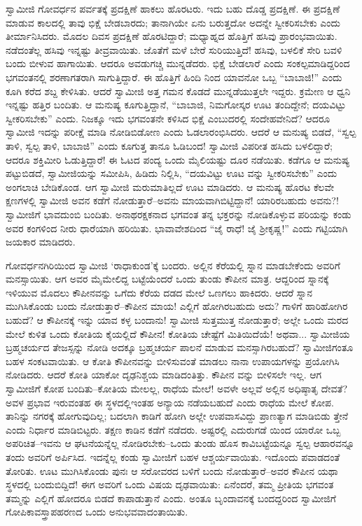 ಸ್ವಾಮೀಜಿ ಗೋವರ್ಧನ ಪರ್ವತಕ್ಕೆ ಪ್ರದಕ್ಷಿಣೆ ಹಾಕಲು ಹೊರಟರು. ಇದು ಬಹು ದೊಡ್ಡ ಪ್ರದಕ್ಷಿಣೆ. ಈ ಪ್ರದಕ್ಷಿಣೆ ಮಾಡುವ ಕಾಲದಲ್ಲಿ ತಾವು ಭಿಕ್ಷೆ ಬೇಡಬಾರದು; ತಾನಾಗಿಯೇ ಏನು ಬರುತ್ತದೋ ಅದನ್ನೇ ಸ್ವೀಕರಿಸಬೇಕು ಎಂದು ತೀರ್ಮಾನಿಸಿದರು. ಮೊದಲ ದಿವಸ ಪ್ರದಕ್ಷಿಣೆ ಹೊರಟಿದ್ದಾರೆ; ಮಧ್ಯಾಹ್ನದ ಹೊತ್ತಿಗೆ ಹಸಿವು ಪ್ರಾರಂಭವಾಯಿತು. ನಡೆದಂತೆಲ್ಲ ಹಸಿವು ಇನ್ನಷ್ಟು ತೀವ್ರವಾಯಿತು. ಜೊತೆಗೆ ಮಳೆ ಬೇರೆ ಸುರಿಯುತ್ತಿದೆ! ಹಸಿವು, ಬಳಲಿಕೆ ಸೇರಿ ಬವಳಿ ಬಂದು ಬೀಳುವ ಹಾಗಾಯಿತು. ಆದರೂ ಅವಡುಗಚ್ಚಿ ಮುನ್ನಡೆದರು. ಭಿಕ್ಷೆ ಬೇಡಲಾರೆ ಎಂದು ಸಂಕಲ್ಪಮಾಡಿದ್ದರಿಂದ ಭಗವಂತನಲ್ಲಿ ಶರಣಾಗತರಾಗಿ ಸಾಗುತ್ತಿದ್ದಾರೆ. ಈ ಹೊತ್ತಿಗೆ ಹಿಂದಿ ನಿಂದ ಯಾವನೋ ಒಬ್ಬ “ಬಾಬಾಜಿ!” ಎಂದು ಕೂಗಿ ಕರೆದ ಶಬ್ದ ಕೇಳಿಸಿತು. ಆದರೆ ಸ್ವಾಮೀಜಿ ಅತ್ತ ಗಮನ ಕೊಡದೆ ಮುನ್ನಡೆಯುತ್ತಲೇ ಇದ್ದರು. ಕ್ರಮೇಣ ಆ ಧ್ವನಿ ಇನ್ನಷ್ಟು ಹತ್ತಿರ ಬಂದಿತು. ಆ ಮನುಷ್ಯ ಕೂಗುತ್ತಿದ್ದಾನೆ, “ಬಾಬಾಜಿ, ನಿಮಗೋಸ್ಕರ ಊಟ ತಂದಿದ್ದೇನೆ; ದಯವಿಟ್ಟು ಸ್ವೀಕರಿಸಬೇಕು” ಎಂದು. ನಿಜಕ್ಕೂ ಇದು ಭಗವಂತನೇ ಕಳಿಸಿದ ಭಿಕ್ಷೆ ಎಂಬುದರಲ್ಲಿ ಸಂದೇಹವೇನಿದೆ? ಆದರೂ ಸ್ವಾಮೀಜಿ ಇದನ್ನು ಪರೀಕ್ಷೆ ಮಾಡಿ ನೋಡಿಬಿಡೋಣ ಎಂದು ಓಡಲಾರಂಭಿಸಿದರು. ಆದರೆ ಆ ಮನುಷ್ಯ ಬಿಡದೆ, “ಸ್ವಲ್ಪ ತಾಳಿ, ಸ್ವಲ್ಪ ತಾಳಿ, ಬಾಬಾಜಿ” ಎಂದು ಕೂಗುತ್ತ ತಾನೂ ಓಡಿಬಂದ! ಸ್ವಾಮೀಜಿ ವಿಪರೀತ ಹಸಿದು ಬಳಲಿದ್ದಾರೆ; ಆದರೂ ಶಕ್ತಿಮೀರಿ ಓಡುತ್ತಿದ್ದಾರೆ! ಈ ಓಟದ ಪಂದ್ಯ ಒಂದು ಮೈಲಿಯಷ್ಟು ದೂರ ನಡೆಯಿತು. ಕಡೆಗೂ ಆ ಮನುಷ್ಯ ಪಟ್ಟುಬಿಡದೆ, ಸ್ವಾಮೀಜಿಯನ್ನು ಸಮೀಪಿಸಿ, ಹಿಡಿದು ನಿಲ್ಲಿಸಿ, “ದಯವಿಟ್ಟು ಊಟ ವನ್ನು ಸ್ವೀಕರಿಸಬೇಕು” ಎಂದು ಅಂಗಲಾಚಿ ಬೇಡಿಕೊಂಡ. ಆಗ ಸ್ವಾಮೀಜಿ ಮರುಮಾತಿಲ್ಲದೆ ಊಟ ಮಾಡಿದರು. ಆ ಮನುಷ್ಯ ಹೊರಟ ಕೆಲವೇ ಕ್ಷಣಗಳಲ್ಲಿ ಸ್ವಾಮೀಜಿ ಅವನ ಕಡೆಗೆ ನೋಡುತ್ತಾರೆ–ಅವನು ಮಾಯವಾಗಿಬಿಟ್ಟಿದ್ದಾನೆ! ಯಾರಿರಬಹುದು ಅವನು?! ಸ್ವಾಮೀಜಿಗೆ ಭಾವದುಂಬಿ ಬಂದಿತು. ಅನಾಥರಕ್ಷಕನಾದ ಭಗವಂತ ತನ್ನ ಭಕ್ತರನ್ನು ನೋಡಿಕೊಳ್ಳುವ ಪರಿಯನ್ನು ಕಂಡು ಅವರ ಕಂಗಳಿಂದ ನೀರು ಧಾರೆಯಾಗಿ ಹರಿಯಿತು. ಭಾವಾವೇಶದಿಂದ “ಜೈ ರಾಧೆ! ಜೈ ಶ್ರೀಕೃಷ್ಣ!” ಎಂದು ಗಟ್ಟಿಯಾಗಿ ಜಯಕಾರ ಮಾಡಿದರು.

ಗೋವರ್ಧನಗಿರಿಯಿಂದ ಸ್ವಾಮೀಜಿ ‘ರಾಧಾಕುಂಡ’ಕ್ಕೆ ಬಂದರು. ಅಲ್ಲಿನ ಕೆರೆಯಲ್ಲಿ ಸ್ನಾನ ಮಾಡಬೇಕೆಂದು ಅವರಿಗೆ ಮನಸ್ಸಾಯಿತು. ಆಗ ಅವರ ಮೈಮೇಲಿದ್ದ ಬಟ್ಟೆಯೆಂದರೆ ಒಂದು ತುಂಡು ಕೌಪೀನ ಮಾತ್ರ. ಆದ್ದರಿಂದ ಸ್ನಾನಕ್ಕೆ ಇಳಿಯುವ ಮೊದಲು ಕೌಪೀನವನ್ನು ಒಗೆದು ಕೆರೆಯ ದಡದ ಮೇಲೆ ಒಣಗಲು ಹಾಕಿದರು. ಆದರೆ ಸ್ನಾನ ಮುಗಿಸಿಕೊಂಡು ಬಂದು ನೋಡುತ್ತಾರೆ–ಕೌಪೀನ ಮಾಯ! ಎಲ್ಲಿಗೆ ಹೋಗಿರಬಹುದು ಅದು? ಗಾಳಿಗೆ ಹಾರಿಹೋಗಿರ ಬಹುದೆ? ಆ ಕೌಪೀನಕ್ಕೆ ಇನ್ನು ಯಾವ ಕಳ್ಳ ಬಂದಾನು! ಸ್ವಾಮೀಜಿ ಸುತ್ತಮುತ್ತ ನೋಡುತ್ತಾರೆ; ಅಲ್ಲೇ ಒಂದು ಮರದ ಮೇಲೆ ಕುಳಿತ ಒಂದು ಕೋತಿಯ ಕೈಯಲ್ಲಿದೆ ಕೌಪೀನ! ಕೋತಿಯ ಚೇಷ್ಟೆಗೆ ಮಿತಿಯಿದೆಯೆ! ಅಥವಾ... ಸ್ವಾಮೀಜಿಯ ಬ್ರಹ್ಮಚರ್ಯದ ತೇಜಸ್ಸನ್ನು ನೋಡಿ ಅದಕ್ಕೂ ಬ್ರಹ್ಮಚರ್ಯ ಪಾಲನೆ ಮಾಡುವ ಮನಸ್ಸಾಗಿರಬಹುದೆ? ಸ್ವಾಮೀಜಿಗಂತೂ ಬಹಳ ಸಂಕಟವಾಯಿತು. ಆ ಕೋತಿ ಕೌಪೀನವನ್ನು ಬೀಳಿಸುವಂತೆ ಮಾಡಲು ನಾನಾ ಉಪಾಯಗಳನ್ನು ಪ್ರಯೋಗಿಸಿ ನೋಡಿದರು. ಆದರೆ ಕೋತಿ ಯಾಕೋ ದೃಢನಿಶ್ಚಯ ಮಾಡಿದಂತಿತ್ತು. ಕೌಪೀನ ವನ್ನು ಬೀಳಿಸಲೇ ಇಲ್ಲ. ಆಗ ಸ್ವಾಮೀಜಿಗೆ ಕೋಪ ಬಂದಿತು–ಕೋತಿಯ ಮೇಲಲ್ಲ, ರಾಧೆಯ ಮೇಲೆ! ಅವಳೇ ಅಲ್ಲವೆ ಅಲ್ಲಿನ ಅಧಿಷ್ಠಾತೃ ದೇವತೆ? ಅವಳ ಪ್ರಭಾವ ಇರುವಂತಹ ಈ ಸ್ಥಳದಲ್ಲಿಇಂತಹ ಅನ್ಯಾಯ ನಡೆಯಬಹುದೆ ಎಂದು ರಾಧೆಯ ಮೇಲೆ ಕೋಪ. ತಾನಿನ್ನು ನಗರಕ್ಕೆ ಹೋಗುವುದಿಲ್ಲ; ಬದಲಾಗಿ ಕಾಡಿಗೆ ಹೋಗಿ ಅಲ್ಲೇ ಉಪವಾಸವಿದ್ದು ಪ್ರಾಣತ್ಯಾಗ ಮಾಡಿಬಿಡು ತ್ತೇನೆ ಎಂದು ನಿರ್ಧಾರ ಮಾಡಿಬಿಟ್ಟರು. ತಕ್ಷಣ ಕಾಡಿನ ಕಡೆಗೆ ನಡೆದರು. ಅಷ್ಟರಲ್ಲಿ ಎದುರುಗಡೆ ಯಿಂದ ಯಾರೋ ಒಬ್ಬ ಅಪರಿಚಿತ–ಇವನು ಆ ಘಟನೆಯನ್ನೆಲ್ಲ ನೋಡಿರಬೇಕು–ಒಂದು ತುಂಡು ಹೊಸ ಕಾವಿಬಟ್ಟೆಯನ್ನೂ ಸ್ವಲ್ಪ ಆಹಾರವನ್ನೂ ತಂದು ಅವರಿಗೆ ಅರ್ಪಿಸಿದ. ಇದನ್ನೆಲ್ಲ ಕಂಡು ಸ್ವಾಮೀಜಿಗೆ ಬಹಳ ಆಶ್ಚರ್ಯವಾಯಿತು. ಇದೊಂದು ಪವಾಡದಂತೆ ತೋರಿತು. ಊಟ ಮುಗಿಸಿಕೊಂಡು ಪುನಃ ಆ ಸರೋವರದ ಬಳಿಗೆ ಬಂದು ನೋಡುತ್ತಾರೆ–ಅವರ ಕೌಪೀನ ಯಥಾ ಸ್ಥಳದಲ್ಲಿ ಬಂದುಬಿದ್ದಿದೆ! ಈಗ ಅವರಿಗೆ ಒಂದು ವಿಷಯ ದೃಢವಾಯಿತು: ಏನೆಂದರೆ, ತಮ್ಮ ಪ್ರೀತಿಯ ಭಗವಂತ ತಮ್ಮನ್ನು ಎಲ್ಲಿಗೆ ಹೋದರೂ ಬಿಡದೆ ಕಾಪಾಡುತ್ತಾನೆ ಎಂದು. ಅಂತೂ ಬೃಂದಾವನಕ್ಕೆ ಬಂದದ್ದರಿಂದ ಸ್ವಾಮೀಜಿಗೆ ಗೋಪಿಕಾವಸ್ತ್ರಾಪಹರಣದ ಒಂದು ಅನುಭವವಾದಂತಾಯಿತು.

